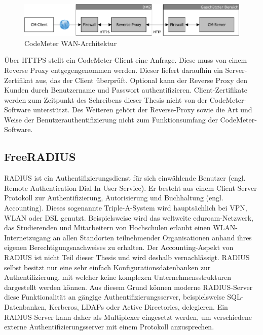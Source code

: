 \documentclass[11pt,a4paper]{report}
\begin{document}
\begin{figure}[htbp]
\centering
\includegraphics[scale=0.9]{images/design_wan_codemeter.pdf}
\caption{CodeMeter WAN-Architektur}
\label{fig:radius_access}
\end{figure}

Über HTTPS stellt ein CodeMeter-Client eine Anfrage. Diese muss von einem Reverse Proxy entgegengenommen werden. Dieser liefert daraufhin ein Server-Zertifikat aus, das der Client überprüft. Optional kann der Reverse Proxy den Kunden durch Benutzername und Passwort authentifizieren. Client-Zertifikate werden zum Zeitpunkt des Schreibens dieser Thesis nicht von der CodeMeter-Software unterstützt. Des Weiteren gehört der Reverse-Proxy sowie die Art und Weise der Benutzerauthentifizierung nicht zum Funktionsumfang der CodeMeter-Software. 

\subsection{FreeRADIUS}

RADIUS ist ein Authentifizierungsdienst für sich einwählende Benutzer (engl. Remote Authentication Dial-In User Service). Er besteht aus einem Client-Server-Protokoll zur Authentifizierung, Autorisierung und Buchhaltung (engl. Accounting). Dieses sogenannte Triple-A-System wird hauptsächlich bei VPN, WLAN oder DSL genutzt. Beispielsweise wird das weltweite eduroam-Netzwerk, das Studierenden und Mitarbeitern von Hochschulen erlaubt einen WLAN-Internetzugang an allen Standorten teilnehmender Organisationen anhand ihres eigenen Berechtigungsnachweises zu erhalten. Der Accounting-Aspekt von RADIUS ist nicht Teil dieser Thesis und wird deshalb vernachlässigt. RADIUS selbst besitzt nur eine sehr einfach Konfigurationsdatenbanken zur Authentifizierung, mit welcher keine komplexen Unternehmensstrukturen dargestellt werden können. Aus diesem Grund können moderne RADIUS-Server diese Funktionalität an gängige Authentifizierungsserver, beispielsweise SQL-Datenbanken, Kerberos, LDAPs oder Active Directories, delegieren. Ein RADIUS-Server kann daher als Multiplexer eingesetzt werden, um verschiedene externe Authentifizierungsserver mit einem Protokoll anzusprechen.
\end{document}
